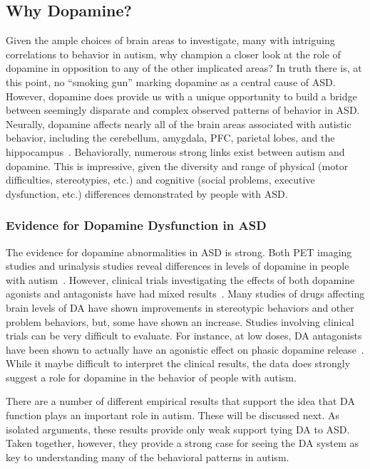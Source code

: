 %
% 

\subsection{Why Dopamine?} 
Given the ample choices of brain areas to investigate, many with intriguing correlations to behavior in autism, why champion a closer look at the role of dopamine in opposition to any of the other implicated areas?  In truth there is, at this point, no ``smoking gun'' marking dopamine as a central cause of ASD.  However, dopamine does provide us with a unique opportunity to build a bridge between seemingly disparate and complex observed patterns of behavior in ASD.  Neurally, dopamine affects nearly all of the brain areas associated with autistic behavior, including the cerebellum, amygdala, PFC, parietal lobes, and the hippocampus~\cite{RefWorks:151,RefWorks:152,RefWorks:153,RefWorks:154,RefWorks:155,RefWorks:156}.  Behaviorally, numerous strong links exist between autism and dopamine.   This is impressive, given the diversity and range of physical (motor difficulties, stereotypies, etc.) and cognitive (social problems, executive dysfunction, etc.) differences demonstrated by people with ASD.  

\subsubsection{Evidence for Dopamine Dysfunction in ASD}
The evidence for dopamine abnormalities in ASD is strong. Both PET imaging studies and urinalysis studies reveal differences in levels of dopamine in people with autism~\cite{FernellE:1997:AutismPET,MartineauJ:1992:AutismDopamine}.  However, clinical trials investigating the effects of both dopamine agonists and antagonists have had mixed results~\cite{PoseyDJ:2000:AutismDopamine,TsaiLY:1999:AutismDopamine}.  Many studies of drugs affecting brain levels of DA have shown improvements in stereotypic behaviors and other problem behaviors, but, some have shown an increase.  Studies involving clinical trials can be very difficult to evaluate.  For instance, at low doses, DA antagonists have been shown to actually have an agonistic effect on phasic dopamine release~\cite{RefWorks:157}.  While it maybe difficult to interpret the clinical results, the data does strongly suggest a role for dopamine in the behavior of people with autism.  

There are a number of different empirical results that support the idea that DA function plays an important role in autism.  These will be discussed next.  As isolated arguments, these results provide only weak support tying DA to ASD.  Taken together, however, they provide a strong case for seeing the DA system as key to understanding many of the behavioral patterns in autism. 

